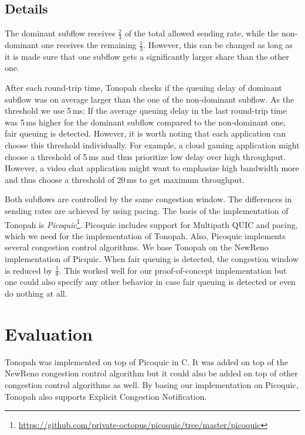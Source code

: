 \documentclass[conference]{IEEEtran}
\begin{document}
\subsection{Details}

The dominant subflow receives $\frac{2}{3}$ of the total allowed sending rate, while the non-dominant one receives the remaining $\frac{1}{3}$. However, this can be changed as long as it is made sure that one subflow gets a significantly larger share than the other one. 

After each round-trip time, Tonopah checks if the queuing delay of dominant subflow was on average larger than the one of the non-dominant subflow. As the threshold we use 5\,ms: If the average queuing delay in the last round-trip time was 5\,ms higher for the dominant subflow compared to the non-dominant one, fair queuing is detected. However, it is worth noting that each application can choose this threshold individually. For example, a cloud gaming application might choose a threshold of 5\,ms and thus prioritize low delay over high throughput. However, a video chat application might want to emphasize high bandwidth more and thus choose a threshold of 20\,ms to get maximum throughput. 

Both subflows are controlled by the same congestion window. The differences in sending rates are achieved by using pacing. 
The basis of the implementation of Tonopah is \textit{Picoquic}\footnote{\url{https://github.com/private-octopus/picoquic/tree/master/picoquic}}. 
Picoquic includes support for Multipath QUIC and pacing, which we need for the implementation of Tonopah. Also, Picoquic implements several congestion control algorithms. 
We base Tonopah on the NewReno implementation of Picquic. When fair queuing is detected, the congestion window is reduced by $\frac{1}{8}$. 
This worked well for our proof-of-concept implementation but one could also specify any other behavior in case fair queuing is detected or even do nothing at all. 

\section{Evaluation}

Tonopah was implemented on top of Picoquic in C. It was added on top of the NewReno congestion control algorithm but it could also be added on top of other 
congestion control algorithms as well. By basing our implementation on Picoquic, Tonopah also supports Explicit Congestion Notification. 
\end{document}
